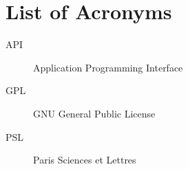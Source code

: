 \chapter*{List of Acronyms}

\begin{description}
\item[API] Application Programming Interface
\item[GPL] GNU General Public License
\item[PSL] Paris Sciences et Lettres
\end{description}
